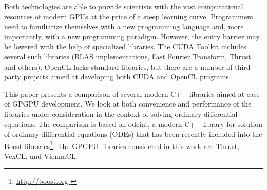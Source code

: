 \documentclass[final]{siamltex}
\begin{document}
Both technologies are able to provide scientists with the vast computational
resources of modern GPUs at the price of a steep learning curve.
Programmers need to familiarize
themselves with a new programming language and, more importantly, with a
new programming paradigm. However, the entry barrier may be lowered with the help of
specialized libraries. The CUDA Toolkit includes several such libraries (BLAS
implementations, Fast Fourier Transform, Thrust and others). OpenCL lacks
standard libraries, but there are a number of third-party projects aimed at
developing both CUDA and OpenCL programs.

This paper presents a comparison of several modern C++ libraries aimed
at ease of GPGPU development. We look at both convenience and
performance of the libraries under consideration in the context of
solving ordinary differential equations.  The comparison is based on
odeint, a modern C++ library for solution of ordinary differential equations (ODEs) that has been recently
included into the Boost libraries\footnote{ \href{ http://boost.org }
  { http://boost.org } }.  The GPGPU libraries considered in this work
are Thrust, VexCL, and ViennaCL:


\end{document}
